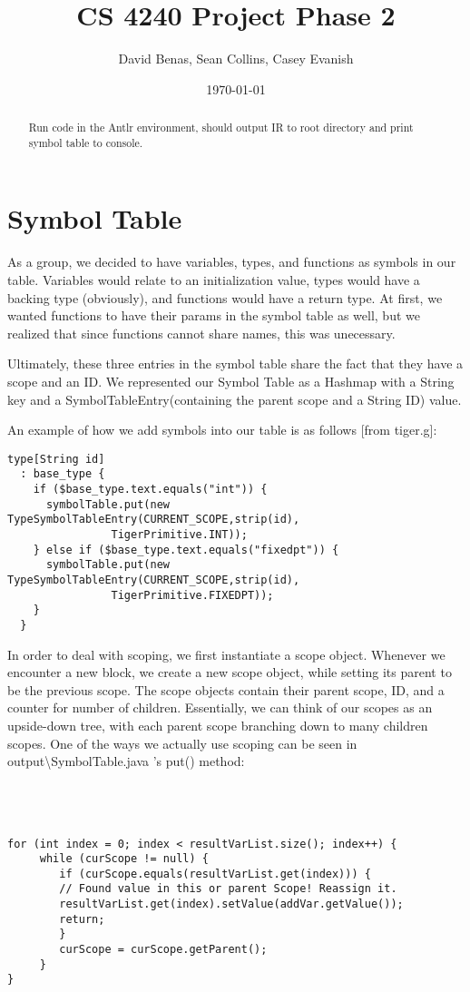 \documentclass[a4paper]{article}
\title{CS 4240 Project Phase 2}
\author{David Benas, Sean Collins, Casey Evanish}
\date{\today}
\begin{document}
\maketitle

\begin{abstract}
Run code in the Antlr environment, should output IR to root directory and print symbol table to console.
\end{abstract}

\section{Symbol Table}
  As a group, we decided to have variables, types, and functions as symbols in our table. Variables would relate to an initialization value, types would have a backing type (obviously), and functions would have a return type. At first, we wanted functions to have their params in the symbol table as well, but we realized that since functions cannot share names, this was unecessary. 

Ultimately, these three entries in the symbol table share the fact that they have a scope and an ID. We represented our Symbol Table as a Hashmap with a String key and a SymbolTableEntry(containing the parent scope and a String ID) value.

An example of how we add symbols into our table is as follows [from tiger.g]:
\begin{verbatim}
type[String id] 
  : base_type {
    if ($base_type.text.equals("int")) { 
      symbolTable.put(new TypeSymbolTableEntry(CURRENT_SCOPE,strip(id), 
                TigerPrimitive.INT));
    } else if ($base_type.text.equals("fixedpt")) {
      symbolTable.put(new TypeSymbolTableEntry(CURRENT_SCOPE,strip(id), 
                TigerPrimitive.FIXEDPT));
    }
  }
\end{verbatim}

In order to deal with scoping, we first instantiate a scope object. Whenever we encounter a new block, we create a new scope object, while setting its parent to be the previous scope. The scope objects contain their parent scope, ID, and a counter for number of children. Essentially, we can think of our scopes as an upside-down tree, with each parent scope branching down to many children scopes. One of the ways we actually use scoping can be seen in output\textbackslash SymbolTable.java 's put() method: \\ \\ \\ \\
\begin{verbatim}
for (int index = 0; index < resultVarList.size(); index++) {
     while (curScope != null) {
        if (curScope.equals(resultVarList.get(index))) {
        // Found value in this or parent Scope! Reassign it.
        resultVarList.get(index).setValue(addVar.getValue());
        return;
        }           
        curScope = curScope.getParent();
     }          
}
\end{verbatim}
\end{document}
